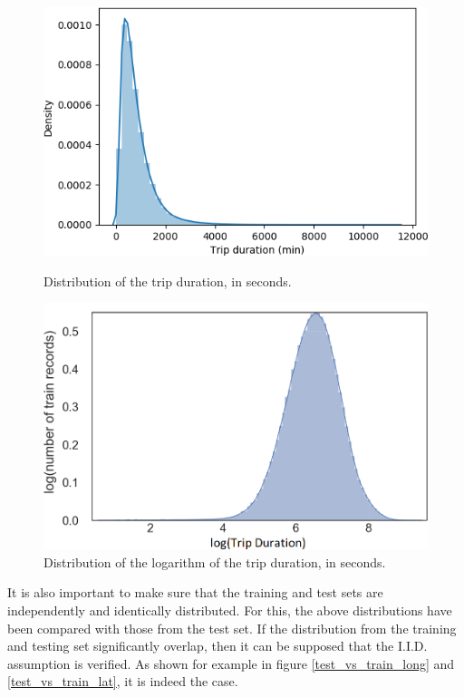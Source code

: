 \documentclass[a4paper]{article}
\begin{document}
\begin{figure}
    \centering
    \begin{minipage}{.45\textwidth}
        \includegraphics[width=\linewidth]{trip_duration}
        \caption{Distribution of the trip duration, in seconds.}
        \label{trip_duration}
    \end{minipage}
    \hspace{0.05\textwidth}
   \begin{minipage}{.45\textwidth}
       \includegraphics[width=\linewidth]{log_trip_duration}
       \caption{Distribution of the logarithm of the trip duration, in seconds.}
       \label{log_trip_duration}
    \end{minipage}
\end{figure}

It is also important to make sure that the training and test sets are
independently and identically distributed. For this, the above distributions
have been compared with those from the test set. If the distribution from the
training and testing set significantly overlap, then it can be supposed that
the I.I.D. assumption is verified. As shown for example in figure
\ref{test_vs_train_long} and \ref{test_vs_train_lat}, it is indeed the case.
\end{document}
